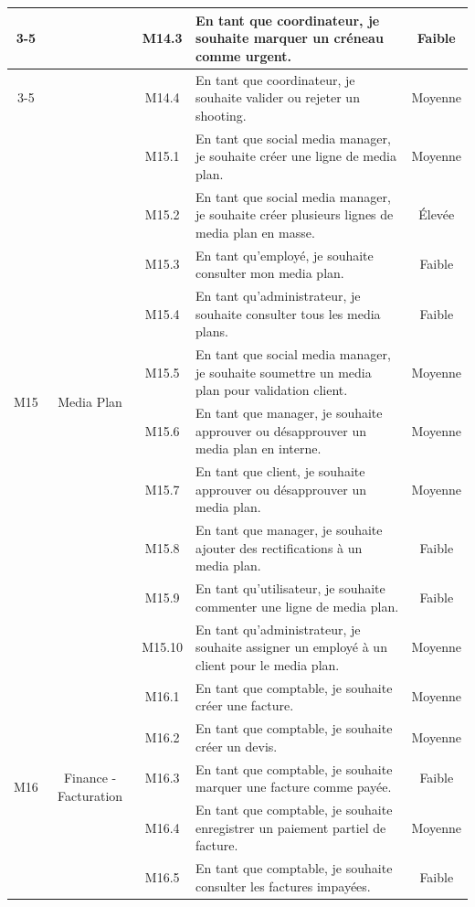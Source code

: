 \begin{longtable}{|c|c|c|p{7.2cm}|c|}
\cline{3-5}
 & & M14.3 & En tant que coordinateur, je souhaite marquer un créneau comme urgent. & Faible \\
\cline{3-5}
 & & M14.4 & En tant que coordinateur, je souhaite valider ou rejeter un shooting. & Moyenne \\
\hline
\multirow{10}{*}{M15} & \multirow{10}{*}{Media Plan} & M15.1 & En tant que social media manager, je souhaite créer une ligne de media plan. & Moyenne \\
\cline{3-5}
 & & M15.2 & En tant que social media manager, je souhaite créer plusieurs lignes de media plan en masse. & Élevée \\
\cline{3-5}
 & & M15.3 & En tant qu'employé, je souhaite consulter mon media plan. & Faible \\
\cline{3-5}
 & & M15.4 & En tant qu'administrateur, je souhaite consulter tous les media plans. & Faible \\
\cline{3-5}
 & & M15.5 & En tant que social media manager, je souhaite soumettre un media plan pour validation client. & Moyenne \\
\cline{3-5}
 & & M15.6 & En tant que manager, je souhaite approuver ou désapprouver un media plan en interne. & Moyenne \\
\cline{3-5}
 & & M15.7 & En tant que client, je souhaite approuver ou désapprouver un media plan. & Moyenne \\
\cline{3-5}
 & & M15.8 & En tant que manager, je souhaite ajouter des rectifications à un media plan. & Faible \\
\cline{3-5}
 & & M15.9 & En tant qu'utilisateur, je souhaite commenter une ligne de media plan. & Faible \\
\cline{3-5}
 & & M15.10 & En tant qu'administrateur, je souhaite assigner un employé à un client pour le media plan. & Moyenne \\
\hline
\multirow{7}{*}{M16} & \multirow{7}{*}{Finance - Facturation} & M16.1 & En tant que comptable, je souhaite créer une facture. & Moyenne \\
\cline{3-5}
 & & M16.2 & En tant que comptable, je souhaite créer un devis. & Moyenne \\
\cline{3-5}
 & & M16.3 & En tant que comptable, je souhaite marquer une facture comme payée. & Faible \\
\cline{3-5}
 & & M16.4 & En tant que comptable, je souhaite enregistrer un paiement partiel de facture. & Moyenne \\
\cline{3-5}
 & & M16.5 & En tant que comptable, je souhaite consulter les factures impayées. & Faible \\

\end{longtable}
